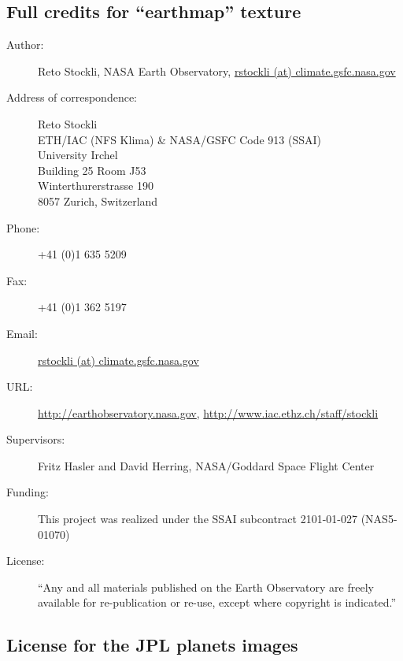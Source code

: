 \subsection{Full credits for ``earthmap'' texture}
\label{sec:ack:credits:stockli}
\begin{description}
\item[Author:] Reto Stockli, NASA Earth Observatory,
		\url{rstockli (at) climate.gsfc.nasa.gov}
\item[Address of correspondence:]
        \begin{minipage}[t]{\textwidth}
		Reto Stockli\\
		ETH/IAC (NFS Klima) \& NASA/GSFC Code 913 (SSAI)\\
		University Irchel\\
		Building 25 Room J53\\
		Winterthurerstrasse 190\\
		8057 Zurich, Switzerland
		\end{minipage}
\item[Phone:]  +41 (0)1 635 5209
\item[Fax:]    +41 (0)1 362 5197
\item[Email:]  \url{rstockli (at) climate.gsfc.nasa.gov}
\item[URL:]	\url{http://earthobservatory.nasa.gov},
	\url{http://www.iac.ethz.ch/staff/stockli}
\item[Supervisors:]
		Fritz Hasler and David Herring, NASA/Goddard Space Flight Center
\item[Funding:]
		This project was realized under the SSAI subcontract 2101-01-027 (NAS5-01070)
\item[License:]
		``Any and all materials published on the Earth Observatory are
		freely available for re-publication or re-use, except where
		copyright is indicated.''
\end{description}

\subsection{License for the JPL planets images}
\label{sec:ack:credits:jpl}

